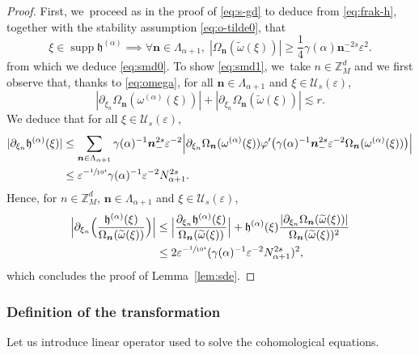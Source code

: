 \documentclass[10pt,a4paper]{amsart}
\theoremstyle{plain}
\theoremstyle{definition}
\DeclareMathOperator{\supp}{supp}
\newcommand{\nb}{{\boldsymbol n}}
\newcommand{\Z}{\mathbb{Z}}
\newcommand{\1}{\mathbf{1}}
\let\epsilon\varepsilon
\begin{document}
\begin{proof}
First, we~proceed as in the proof of \eqref{eq:s-gd} to deduce from \eqref{eq:frak-h}, together with the stability assumption \eqref{eq:o-tilde0}, that
\begin{equation}
\label{eq:76}
\xi\in\supp \mathfrak{h}^{(\alpha)}\implies \forall \nb\in\Lambda_{\alpha+1},\; |\Omega_{\nb}(\widetilde{\omega}(\xi))|\geq\frac{1}{4}\gamma(\alpha)\nb_{-}^{-2s}\epsilon^{2}.
\end{equation}
from which we deduce \eqref{eq:smd0}. To show \eqref{eq:smd1}, we~take $n\in\Z_{M}^{d}$ and we first observe that, thanks to \eqref{eq:omega}, for all $\nb\in\Lambda_{\alpha+1}$ and $\xi\in\mathcal{U}_{s}(\epsilon)$,
\[
|\partial_{\xi_{n}}\Omega_{\nb}(\omega^{(\alpha)}(\xi))|
+
|\partial_{\xi_{n}}\Omega_{\nb}(\widetilde{\omega}(\xi))| \lesssim r.
\]
We deduce that for all $\xi\in\mathcal{U}_{s}(\epsilon)$,
\begin{equation*}
\begin{split}
\label{eq:dhf}
|\partial_{\xi_{n}}\mathfrak{h}^{(\alpha)}(\xi)|
&\leq \sum_{\nb\in\Lambda_{\alpha+1}}\gamma(\alpha)^{-1}\nb_{-}^{2s}\epsilon^{-2}
\Big|
\partial_{\xi_{n}}\Omega_{\nb}(\omega^{(\alpha)}(\xi))
\varphi'
\big(
\gamma(\alpha)^{-1}\nb_{-}^{2s}\epsilon^{-2}\Omega_{\nb}(\omega^{(\alpha)}(\xi))
\big)
\Big| \\
&\leq \epsilon^{-\sfrac{1}{10^{4}}}\gamma(\alpha)^{-1}\epsilon^{-2}N_{\alpha+1}^{2s}.
\end{split}
\end{equation*}
Hence, for $n\in\Z_{M}^{d}$, $\nb\in\Lambda_{\alpha+1}$ and $\xi\in\mathcal{U}_{s}(\epsilon)$,
\begin{align*}
\Big|\partial_{\xi_{n}}\Big(
\frac{\mathfrak{h}^{(\alpha)}(\xi)}{\Omega_{\nb}(\widetilde{\omega}(\xi))}
\Big)
\Big|
&\leq
\Big|
\frac{\partial_{\xi_{n}}\mathfrak{h}^{(\alpha)}(\xi)}{\Omega_{\nb}(\widetilde{\omega}(\xi))}
\Big|
+
\mathfrak{h}^{(\alpha)}(\xi)
\frac{|\partial_{\xi_{n}}\Omega_{\nb}(\widetilde{\omega}(\xi))|}{\Omega_{\nb}(\widetilde{\omega}(\xi))^{2}}\\
&\leq 2\epsilon^{-\sfrac{1}{10^{4}}}(\gamma(\alpha)^{-1}\epsilon^{-2}N_{\alpha+1}^{2s})^{2},
\end{align*}
which concludes the proof of Lemma~\ref{lem:sde}.
\end{proof}
\subsubsection{Definition of the transformation}
\label{sec:Lie} Let us introduce linear operator used to solve the cohomological equations.
\end{document}
